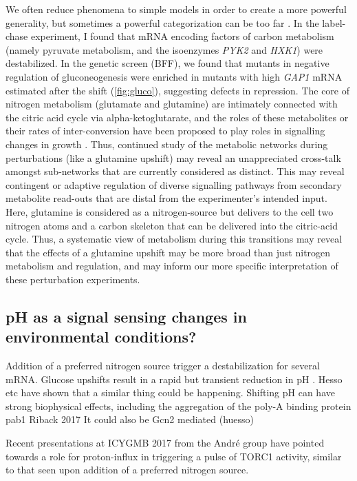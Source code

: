 We often reduce phenomena to simple models in order to
create a more powerful generality, but sometimes a
powerful categorization can be too far
\parencite{lazebnik2002can}.
In the label-chase experiment, I found that mRNA encoding factors of
carbon metabolism (namely pyruvate metabolism, and the isoenzymes 
\textit{PYK2} and \textit{HXK1}) were destabilized.
In the genetic screen (BFF), we found that mutants in negative
regulation of gluconeogenesis were enriched in mutants with high
\textit{GAP1} mRNA estimated after the shift
(\autoref{fig:gluco}), suggesting defects 
in repression. The core of nitrogen metabolism (glutamate and
glutamine) are intimately connected with the citric acid cycle via
alpha-ketoglutarate, and the roles of these metabolites or their
rates of inter-conversion have been proposed to play roles in
signalling changes in growth \parencite{fayyad2016yeast}.
Thus, continued study of the metabolic networks during perturbations
(like a glutamine upshift) may reveal an unappreciated cross-talk
amongst sub-networks that are currently considered as distinct. 
This may reveal contingent or adaptive regulation of diverse
signalling pathways from secondary metabolite read-outs that are
distal from the experimenter's intended input.
Here, glutamine is considered as a nitrogen-source but delivers to 
the cell two nitrogen atoms and a carbon skeleton that can be
delivered into the citric-acid cycle.
Thus, a systematic view of metabolism during this transitions may
reveal that the effects of a glutamine upshift may be more broad than
just nitrogen metabolism and regulation, and may inform our more
specific interpretation of these perturbation experiments.

\subsection{pH as a signal sensing changes in environmental conditions?}

Addition of a preferred nitrogen source trigger a destabilization 
for several mRNA. 
Glucose upshifts result in a rapid but transient reduction in pH
\parencite{kresnowati2008quantitative}.
Hesso etc have shown that a similar thing could be happening.
Shifting pH can have strong biophysical effects, including
the aggregation of the poly-A binding protein pab1
Riback 2017
It could also be Gcn2 mediated (huesso)

Recent presentations at ICYGMB 2017 from the Andr\'{e} group have
pointed towards a role for proton-influx in triggering a pulse of
TORC1 activity, similar to that seen upon addition of a preferred
nitrogen source.


